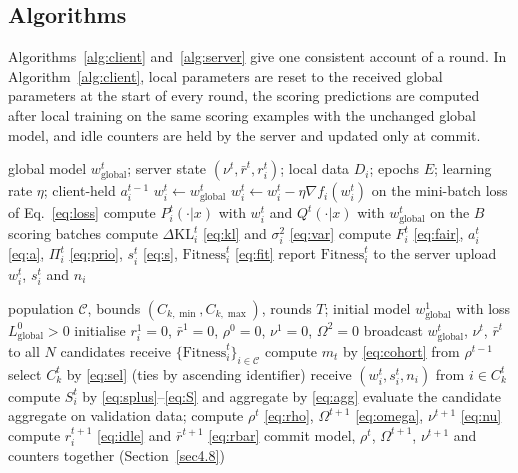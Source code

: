 \documentclass[pdflatex,sn-basic]{sn-jnl}
\newcommand{\KL}{\Delta\mathrm{KL}}
\newcommand{\Fit}{\mathrm{Fitness}}
\begin{document}
\subsection{Algorithms}\label{sec4.9}
Algorithms~\ref{alg:client} and~\ref{alg:server} give one consistent account of a round. In Algorithm~\ref{alg:client}, local parameters are reset to the received global parameters at the start of every round, the scoring predictions are computed after local training on the same scoring examples with the unchanged global model, and idle counters are held by the server and updated only at commit.

\begin{algorithm}[t]
\caption{Client-side training and fitness evaluation (client $i$, round $t$)}\label{alg:client}
\begin{algorithmic}[1]
\Require global model $w_{\mathrm{global}}^t$; server state $(\nu^t,\bar r^t,r_i^t)$; local data $D_i$; epochs $E$; learning rate $\eta$; client-held $a_i^{t-1}$
\State $w_i^t\gets w_{\mathrm{global}}^t$ 
    \State $w_i^t\gets w_i^t-\eta\nabla f_i(w_i^t)$ on the mini-batch loss of Eq.~\eqref{eq:loss}
  \EndFor
\EndFor
\State compute $P_i^t(\cdot|x)$ with $w_i^t$ and $Q^t(\cdot|x)$ with $w_{\mathrm{global}}^t$ on the $B$ scoring batches
\State compute $\KL_i^t$ \eqref{eq:kl} and $\sigma_i^2$ \eqref{eq:var}
\State compute $F_i^t$ \eqref{eq:fair}, $a_i^t$ \eqref{eq:a}, $\Pi_i^t$ \eqref{eq:prio}, $s_i^t$ \eqref{eq:s}, $\Fit_i^t$ \eqref{eq:fit}
\State report $\Fit_i^t$ to the server
  \State upload $w_i^t$, $s_i^t$ and $n_i$
\EndIf
\end{algorithmic}
\end{algorithm}

\begin{algorithm}[t]
\caption{Server-side selection, aggregation and state update}\label{alg:server}
\begin{algorithmic}[1]
\Require population $\mathcal{C}$, bounds $(C_{k,\min},C_{k,\max})$, rounds $T$; initial model $w_{\mathrm{global}}^1$ with loss $L^0_{\mathrm{global}}>0$
\State initialise $r_i^1=0$, $\bar r^1=0$, $\rho^0=0$, $\nu^1=0$, $\Omega^2=0$
  \State broadcast $w_{\mathrm{global}}^t$, $\nu^t$, $\bar r^t$ to all $N$ candidates
  \State receive $\{\Fit_i^t\}_{i\in\mathcal{C}}$
  \State compute $m_t$ by \eqref{eq:cohort} from $\rho^{t-1}$
  \State select $C_k^t$ by \eqref{eq:sel} (ties by ascending identifier)
  \State receive $(w_i^t,s_i^t,n_i)$ from $i\in C_k^t$
  \State compute $S_i^t$ by \eqref{eq:splus}--\eqref{eq:S} and aggregate by \eqref{eq:agg}
  \State evaluate the candidate aggregate on validation data; compute $\rho^t$ \eqref{eq:rho}, $\Omega^{t+1}$ \eqref{eq:omega}, $\nu^{t+1}$ \eqref{eq:nu}
  \State compute $r_i^{t+1}$ \eqref{eq:idle} and $\bar r^{t+1}$ \eqref{eq:rbar}
  \State commit model, $\rho^t$, $\Omega^{t+1}$, $\nu^{t+1}$ and counters together (Section~\ref{sec4.8})
\EndFor
\end{algorithmic}
\end{algorithm}
\end{document}
